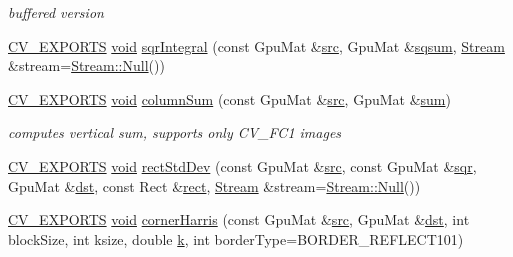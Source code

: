 \begin{DoxyCompactItemize}
\begin{DoxyCompactList}\small\item\em buffered version \end{DoxyCompactList}\item 
\hyperlink{core_2types__c_8h_a1bf9f0e121b54272da02379cfccd0a2b}{C\-V\-\_\-\-E\-X\-P\-O\-R\-T\-S} \hyperlink{legacy_8hpp_a8bb47f092d473522721002c86c13b94e}{void} \hyperlink{namespacecv_1_1gpu_a1b68a581f3d74a8f7ef28ac7a430aff1}{sqr\-Integral} (const Gpu\-Mat \&\hyperlink{legacy_8hpp_a371cd109b74033bc4366f584edd3dacc}{src}, Gpu\-Mat \&\hyperlink{objdetect_8hpp_a9933dc7f409c9e987d15e1527589d3ae}{sqsum}, \hyperlink{classcv_1_1gpu_1_1Stream}{Stream} \&stream=\hyperlink{classcv_1_1gpu_1_1Stream_af96c23564834f88333dcb8997df553f1}{Stream\-::\-Null}())
\item 
\hyperlink{core_2types__c_8h_a1bf9f0e121b54272da02379cfccd0a2b}{C\-V\-\_\-\-E\-X\-P\-O\-R\-T\-S} \hyperlink{legacy_8hpp_a8bb47f092d473522721002c86c13b94e}{void} \hyperlink{namespacecv_1_1gpu_a3794819b6a8cb137837dfa1cd1be8439}{column\-Sum} (const Gpu\-Mat \&\hyperlink{legacy_8hpp_a371cd109b74033bc4366f584edd3dacc}{src}, Gpu\-Mat \&\hyperlink{namespacecv_1_1gpu_a5292ab871ffc965df3968dbe6b9f7b20}{sum})
\begin{DoxyCompactList}\small\item\em computes vertical sum, supports only C\-V\-\_\-F\-C1 images \end{DoxyCompactList}\item 
\hyperlink{core_2types__c_8h_a1bf9f0e121b54272da02379cfccd0a2b}{C\-V\-\_\-\-E\-X\-P\-O\-R\-T\-S} \hyperlink{legacy_8hpp_a8bb47f092d473522721002c86c13b94e}{void} \hyperlink{namespacecv_1_1gpu_afbf9bd1ae2c863760247cde366350c25}{rect\-Std\-Dev} (const Gpu\-Mat \&\hyperlink{legacy_8hpp_a371cd109b74033bc4366f584edd3dacc}{src}, const Gpu\-Mat \&\hyperlink{namespacecv_1_1gpu_a103f8d8b38e54200259c9fa9b8bf5c3c}{sqr}, Gpu\-Mat \&\hyperlink{photo__c_8h_aed13e2a25279b24dc954073233fef7a5}{dst}, const Rect \&\hyperlink{legacy_8hpp_a0b66dd5dfd5fbb6d0d398740ea971f2f}{rect}, \hyperlink{classcv_1_1gpu_1_1Stream}{Stream} \&stream=\hyperlink{classcv_1_1gpu_1_1Stream_af96c23564834f88333dcb8997df553f1}{Stream\-::\-Null}())
\item 
\hyperlink{core_2types__c_8h_a1bf9f0e121b54272da02379cfccd0a2b}{C\-V\-\_\-\-E\-X\-P\-O\-R\-T\-S} \hyperlink{legacy_8hpp_a8bb47f092d473522721002c86c13b94e}{void} \hyperlink{namespacecv_1_1gpu_ab8cc2728fe72db1c51045c05ae7c4142}{corner\-Harris} (const Gpu\-Mat \&\hyperlink{legacy_8hpp_a371cd109b74033bc4366f584edd3dacc}{src}, Gpu\-Mat \&\hyperlink{photo__c_8h_aed13e2a25279b24dc954073233fef7a5}{dst}, int block\-Size, int ksize, double \hyperlink{legacy_8hpp_a7be9b6436e5ea72ff5d5a66779b4bd38}{k}, int border\-Type=B\-O\-R\-D\-E\-R\-\_\-\-R\-E\-F\-L\-E\-C\-T101)

\end{DoxyCompactItemize}
